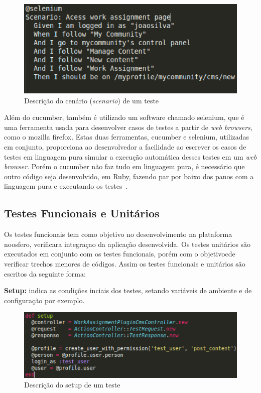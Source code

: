 \begin{enumerate}
\begin{figure}[!h]
    \centering
    \includegraphics[keepaspectratio=true,scale=0.50]
      {figuras/noosfero_scenario.eps}
    \caption{Descrição do cenário (\textit{scenario}) de um teste}
    \label{nosfero_scenario}
\end{figure}

\end{enumerate}

Além do cucumber, também é utilizado um software chamado selenium, que é uma ferramenta
usada para desenvolver casos de testes a partir de \textit{web browsers}, como o mozilla firefox. Estas duas ferramentas, cucumber e selenium, utilizadas em conjunto, proporciona ao desenvolvedor a facilidade ao escrever os casos de testes em linguagem pura simular a execução automática desses testes em um \textit{web browser}. Porém o cucumber não faz tudo em linguagem pura, é necessário que outro código seja desenvolvido, em Ruby, fazendo par por baixo dos panos com a linguagem pura e executando os testes~\cite{akita2011}.

\subsection{Testes Funcionais e Unitários}
%
Os testes funcionais tem como objetivo no desenvolvimento na plataforma noosfero, verificara integraçao da aplicação desenvolvida. Os testes unitários são executados em conjunto com os testes funcionais, porém  com o objetivocde verificar trechos menores de códigos. Assim os testes funcionais e unitários são escritos da seguinte forma:

\textbf{Setup:} indica as condições inciais dos testes, setando variáveis de ambiente e de configuração por exemplo.

\begin{figure}[!h]
    \centering
    \includegraphics[keepaspectratio=true,scale=0.5]
      {figuras/teste_setup.eps}
    \caption{Descrição do setup de um teste}
    \label{nosfero_setup}
\end{figure}

